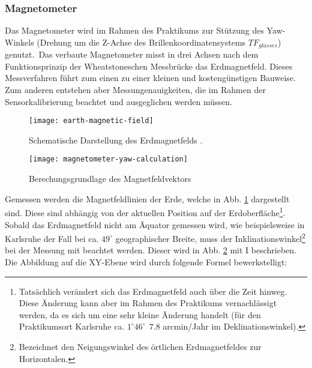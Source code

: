 


\subsubsection{Magnetometer}
\label{headtracking_magnetometer_subsubsec}

Das Magnetometer wird im Rahmen des Praktikums zur Stützung des Yaw-Winkels (Drehung um die Z-Achse des Brillenkoordinatensystems $TF_{glasses}$) genutzt.\
Das verbaute Magnetometer misst in drei Achsen nach dem Funktionsprinzip der Wheatstoneschen Messbrücke \cite{renaudin2010complete} das Erdmagnetfeld.
Dieses Messverfahren führt zum einen zu einer kleinen und kostengünstigen Bauweise.
Zum anderen entstehen aber Messungenauigkeiten, die im Rahmen der Sensorkalibrierung beachtet und ausgeglichen werden müssen.

\begin{figure}[h]
   \centering
   \texttt{[image: earth-magnetic-field]}
   \caption[mag_world]{Schematische Darstellung des Erdmagnetfelds \cite{mag_world_source}.}
   \label{fig:mag_world}
\end{figure}

\begin{figure}[h]
   \centering
   \texttt{[image: magnetometer-yaw-calculation]}
   \caption[mag_mapping]{Berechungsgrundlage des Magnetfeldvektors\cite{wang2006intelligent}}
   \label{fig:mag_mapping}
\end{figure}

Gemessen werden die Magnetfeldlinien der Erde, welche in Abb. \ref{fig:mag_world} dargestellt sind.
Diese sind abhängig von der aktuellen Position auf der Erdoberfläche\footnote{Tatsächlich verändert sich das Erdmagnetfeld auch über die Zeit hinweg.
Diese Änderung kann aber im Rahmen des Praktikums vernachlässigt werden, da es sich um eine sehr kleine Änderung handelt (\zB für den Praktikumsort Karlsruhe ca. $1^\circ 46$'~$7.8$ arcmin/Jahr im Deklinationswinkel).}.
Sobald das Erdmagnetfeld nicht am Äquator gemessen wird, wie beispielsweise in Karlsruhe der Fall bei ca. $49^\circ$ geographischer Breite, muss der Inklinationswinkel\footnote{Bezeichnet den Neigungswinkel des örtlichen Erdmagnetfeldes zur Horizontalen.} bei der Messung mit beachtet werden.
Dieser wird in Abb. \ref{fig:mag_mapping} mit I beschrieben.
Die Abbildung  auf die XY-Ebene wird durch folgende Formel bewerkstelligt:

